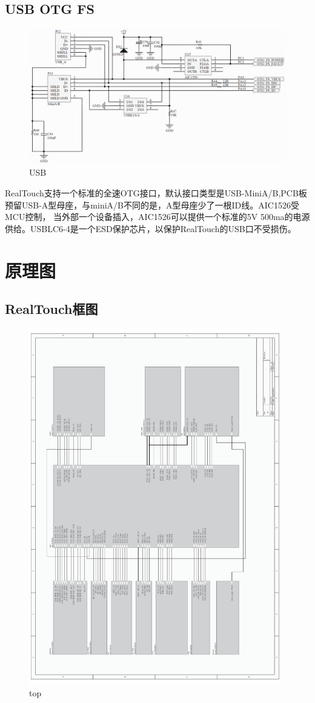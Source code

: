 \documentclass[titlepage]{article}
\begin{document}
  \subsection{USB OTG FS}
  \begin{figure}[h]
  \centering
  \includegraphics[width=15cm]{usb.png}
  \caption{USB}
 \end{figure}
 RealTouch支持一个标准的全速OTG接口，默认接口类型是USB-MiniA/B,PCB板预留USB-A型母座，与miniA/B不同的是，A型母座少了一根ID线。AIC1526受MCU控制，
 当外部一个设备插入，AIC1526可以提供一个标准的5V 500ma的电源供给。USBLC6-4是一个ESD保护芯片，以保护RealTouch的USB口不受损伤。
 \newpage
\section{原理图}
\subsection{RealTouch框图}
  \begin{figure}[h]
  \centering
  \includegraphics[width=11cm]{top.pdf}
  \caption{top}
 \end{figure}
\end{document}
